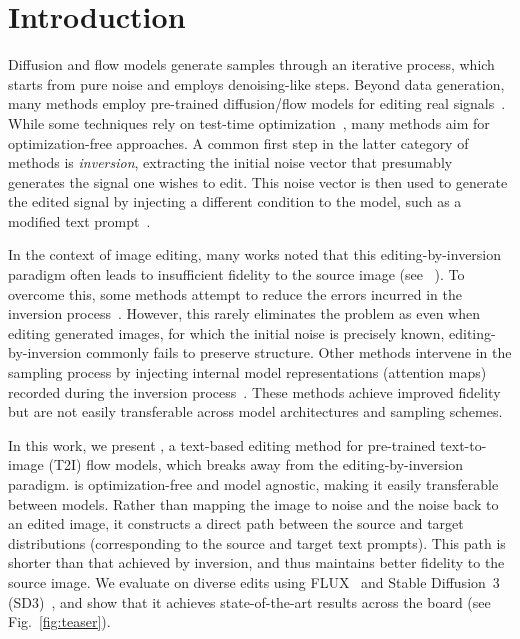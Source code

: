 \section{Introduction}
\label{intro}
Diffusion and flow models generate samples through an iterative process, which starts from pure noise and employs denoising-like steps. Beyond data generation, many methods employ pre-trained diffusion/flow models for editing real signals~\citep{meng2021sdedit,kawar2023imagic,huberman2024edit,tumanyan2023plug, hertz2022prompt, manor2024zero, wu2023tune, qi2023fatezero, cohen24slicedit, haque2023instruct,brack2024leditspp,hertz2023delta,kwon2023diffusion, haas2024discovering}. 
While some techniques rely on test-time optimization~\cite{hertz2023delta,kawar2023imagic}, many methods aim for optimization-free approaches. A common first step in the latter category of methods is \emph{inversion}, \ie extracting the initial noise vector that presumably generates the signal one wishes to edit. This noise vector is then used to generate the edited signal by injecting a different condition to the model, such as a modified text prompt~\citep{wallace2023edict, wu2023latent, huberman2024edit, mokady2023null}. 

In the context of image editing, many works noted that this editing-by-inversion paradigm often leads to insufficient fidelity to the source image (see \eg~\cite{huberman2024edit}). To overcome this, some methods attempt to reduce the errors incurred in the inversion process~\citep{mokady2023null, garibi2024renoise}. However, this rarely eliminates the problem as even when editing generated images, for which the initial noise is precisely known, editing-by-inversion commonly fails to preserve structure. Other methods intervene in the sampling process by injecting internal model representations (\eg attention maps) recorded during the inversion process~\cite{hertz2022prompt, tumanyan2023plug, cao2023masactrl}. These methods achieve improved fidelity but are not easily transferable across model architectures and sampling schemes.

In this work, we present \ours{}, a text-based editing method for pre-trained text-to-image (T2I) flow models, which breaks away from the editing-by-inversion paradigm. \ours{}  is optimization-free and model agnostic, making it easily transferable between models. Rather than mapping the image to noise and the noise back to an edited image, it constructs a direct path between the source and target distributions (corresponding to the source and target text prompts). This path is shorter than that achieved by inversion, and thus maintains better fidelity to the source image. 
We evaluate \ours{} on diverse edits using FLUX~\citep{flux} and Stable Diffusion~3 (SD3)~\citep{esser2024scaling}, and show that it achieves state-of-the-art results across the board (see Fig.~\ref{fig:teaser}).

